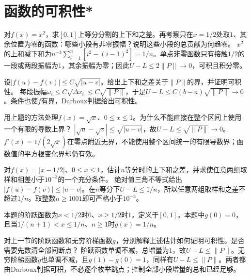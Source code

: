 \par\addvspace{12pt}

\section{函数的可积性*}

对\(f(x)=x^2\)，求\([0,1]\)上等分分割的上下和之差。再考察只在\(x=1/2\)处取\(1\)、其余位置为零的函数：哪些小段有非零振幅？说明这些小段的总贡献为何趋零。
\solutionanswer
\(x^2\)的上和减下和为\(n^{-3}\sum_{i=1}^n[i^2-(i-1)^2]=1/n\)。单点非零函数只有接触\(1/2\)的一段或两段振幅为\(1\)，其余振幅为零；因此\(U-L\le2\|P\|\to0\)，可积且积分零。


设\(|f(u)-f(v)|\le C\sqrt{|u-v|}\)。给出上下和之差关于\(\|P\|\)的界，并证明可积性。
\solutionanswer
每段振幅\(\omega_i\le C\sqrt{\Delta x_i}\le C\sqrt{\|P\|}\)，于是\(U-L\le C(b-a)\sqrt{\|P\|}\to0\)。条件也使\(f\)有界，Darboux判据给出可积性。


用上题的方法处理\(f(x)=\sqrt{x}\)、\(0\le x\le1\)。为什么不能直接在整个区间上使用一个有限的导数上界？
\solutionanswer
\(|\sqrt u-\sqrt v|\le\sqrt{|u-v|}\)，故\(U-L\le\sqrt{\|P\|}\to0\)。\(f'(x)=1/(2\sqrt x)\)在零点附近无界，不能使用整个区间统一的有限导数界；函数值的平方根变化界却仍有效。


对\(f(x)=|x-1/2|\)、\(0\le x\le1\)，估计\(n\)等分时的上下和之差，并求使任意两组取样和相差小于\(10^{-3}\)的一个充分条件。
\solutionanswer
绝对值三角不等式给出\(|f(u)-f(v)|\le|u-v|\)。在\(n\)等分下\(U-L\le1/n\)，所以任意两组取样和之差不超过\(1/n\)。取整数\(n\ge1001\)即可严格小于\(10^{-3}\)。


本题的阶跃函数为\(x<1/2\)时\(0\)、\(x\ge1/2\)时\(1\)，定义于\([0,1]\)。本题中\(g(0)=0\)，且当\(1/(n+1)<x\le1/n\)、\(n\ge1\)时\(g(x)=1/n\)。

对上一节的阶跃函数和无穷阶梯函数\(g\)，分别解释上述估计如何证明可积性。是否需要先数清全部间断点？
\solutionanswer
阶跃函数单调不减，总增量为\(1\)，故\(U-L\le\|P\|\)。无穷阶梯函数\(g\)也单调不减，且\(g(1)-g(0)=1\)，同样有\(U-L\le\|P\|\)。两者都由Darboux判据可积，不必逐个枚举跳点；控制全部小段增量的总和已经足够。


